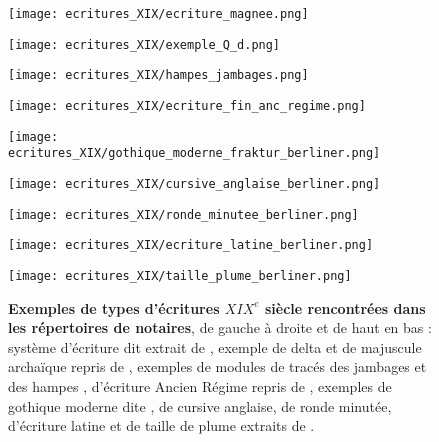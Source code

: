 \begin{figure}[!h]
    \begin{minipage}[c]{.46\linewidth} 
        \centering
        \texttt{[image: ecritures\_XIX/ecriture\_magnee.png]}
    \end{minipage}
    \hfill%
    \begin{minipage}[c]{.46\linewidth}
        \centering
        \texttt{[image: ecritures\_XIX/exemple\_Q\_d.png]}    
    \end{minipage}
\end{figure}
\begin{figure}[!h]
        \centering
        \texttt{[image: ecritures\_XIX/hampes\_jambages.png]}
\end{figure}
\begin{figure}[!h]
    \begin{minipage}[c]{.46\linewidth} 
        \centering
        \texttt{[image: ecritures\_XIX/ecriture\_fin\_anc\_regime.png]}
        \end{minipage}
    \hfill%
    \begin{minipage}[c]{.46\linewidth}
        \centering
        \texttt{[image: ecritures\_XIX/gothique\_moderne\_fraktur\_berliner.png]}
    \end{minipage}
\end{figure}
\begin{figure}[!h]
        \centering
        \texttt{[image: ecritures\_XIX/cursive\_anglaise\_berliner.png]}
\end{figure}
\begin{figure}[h!]
    \centering
    \texttt{[image: ecritures\_XIX/ronde\_minutee\_berliner.png]}    
    \label{fig:my_label}
\end{figure}
\begin{figure}[!h]
        \centering
        \texttt{[image: ecritures\_XIX/ecriture\_latine\_berliner.png]}
\end{figure}
\begin{figure}[!h]
        \centering
        \texttt{[image: ecritures\_XIX/taille\_plume\_berliner.png]}
        \caption{\textbf{Exemples de types d'écritures $ XIX^{e}$ siècle rencontrées dans les répertoires de notaires}, de gauche à droite et de haut en bas : système d'écriture dit  extrait de \cite{magnee_parfait_1828}, exemple de  delta et de  majuscule archaïque repris de \cite{molliard_methode_1861}, exemples de modules de tracés des jambages et des hampes \cite{werdet_innovation_1841}, d'écriture  Ancien Régime repris de \cite{fremont_cahiers_1837}, exemples de gothique moderne dite , de cursive anglaise, de ronde minutée, d'écriture latine et de taille de plume extraits de \cite{berliner_cours_1862}.}
    \label{fig:ecritures_XIX}
\end{figure}
